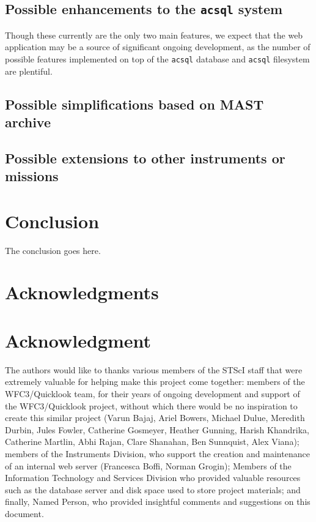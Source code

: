 \documentclass[10pt,journal,compsoc]{IEEEtran}
\begin{document}
\subsection{Possible enhancements to the \texttt{acsql} system}

Though these currently are the only
two main features, we expect that the web application may be a source of significant ongoing development,
as the number of possible features implemented on top of the \texttt{acsql} database and \texttt{acsql}
filesystem are plentiful.

\subsection{Possible simplifications based on MAST archive}

\subsection{Possible extensions to other instruments or missions}


\section{Conclusion}\label{sec:conclusion}
The conclusion goes here.


\ifCLASSOPTIONcompsoc
  \section*{Acknowledgments}
\else
  \section*{Acknowledgment}
\fi
  The authors would like to thanks various members of the STScI staff that were extremely valuable for helping make
  this project come together: members of the WFC3/Quicklook team, for their years of ongoing development and support
  of the WFC3/Quicklook project, without which there would be no inspiration to create this similar project (Varun Bajaj,
  Ariel Bowers, Michael Dulue, Meredith Durbin, Jules Fowler, Catherine Gosmeyer, Heather Gunning, Harish Khandrika,
  Catherine Martlin, Abhi Rajan, Clare Shanahan, Ben Sunnquist, Alex Viana); members of the Instruments Division,
  who support the creation and maintenance of an internal web server (Francesca Boffi, Norman Grogin); Members of the
  Information Technology and Services Division who provided valuable resources such as the database server and disk
  space used to store project materials; and finally, Named Person, who provided insightful comments and suggestions
  on this document.
\end{document}
